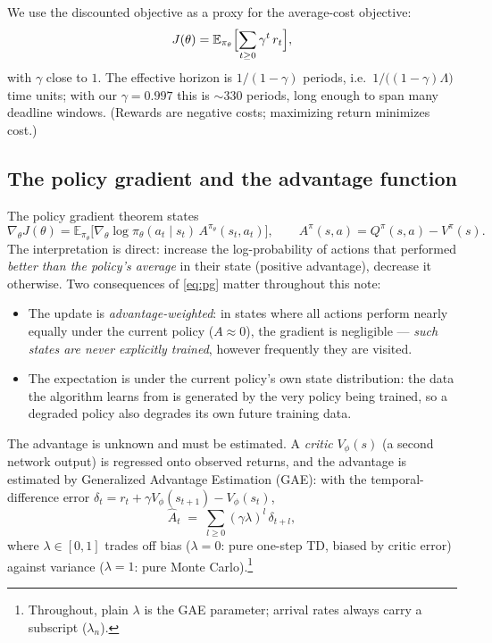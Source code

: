 \documentclass[11pt,a4paper]{article}
\newcommand{\E}{\mathbb{E}}
\begin{document}
We use the discounted objective as a proxy for the average-cost
objective:
\begin{equation}
  J(\theta) = \E_{\pi_\theta}\Bigl[\sum_{t\ge 0} \gamma^{t}\, r_t\Bigr],
\end{equation}
with $\gamma$ close to $1$.  The effective horizon is
$1/(1-\gamma)$ periods, i.e.\ $1/\bigl((1-\gamma)\Lambda\bigr)$ time
units; with our $\gamma = 0.997$ this is ${\sim}330$ periods, long enough
to span many deadline windows.  (Rewards are negative costs; maximizing
return minimizes cost.)

\subsection{The policy gradient and the advantage function}

The policy gradient theorem states
\begin{equation}
  \nabla_\theta J(\theta)
  = \E_{\pi_\theta}\bigl[\nabla_\theta \log \pi_\theta(a_t \mid s_t)\,
    A^{\pi_\theta}(s_t, a_t)\bigr],
  \qquad
  A^{\pi}(s,a) = Q^{\pi}(s,a) - V^{\pi}(s).
  \label{eq:pg}
\end{equation}
The interpretation is direct: increase the log-probability of actions
that performed \emph{better than the policy's average} in their state
(positive advantage), decrease it otherwise.  Two consequences of
\eqref{eq:pg} matter throughout this note:
\begin{itemize}
  \item The update is \emph{advantage-weighted}: in states where all
        actions perform nearly equally under the current policy
        ($A \approx 0$), the gradient is negligible --- \emph{such states
        are never explicitly trained}, however frequently they are
        visited.
  \item The expectation is under the current policy's own state
        distribution: the data the algorithm learns from is generated by
        the very policy being trained, so a degraded policy also degrades
        its own future training data.
\end{itemize}

The advantage is unknown and must be estimated.  A \emph{critic}
$V_\phi(s)$ (a second network output) is regressed onto observed
returns, and the advantage is estimated by Generalized Advantage
Estimation (GAE): with the temporal-difference error
$\delta_t = r_t + \gamma V_\phi(s_{t+1}) - V_\phi(s_t)$,
\begin{equation}
  \hat A_t \;=\; \sum_{l \ge 0} (\gamma \lambda)^{l}\, \delta_{t+l},
  \label{eq:gae}
\end{equation}
where $\lambda \in [0,1]$ trades off bias ($\lambda = 0$: pure one-step
TD, biased by critic error) against variance ($\lambda = 1$: pure Monte
Carlo).\footnote{Throughout, plain $\lambda$ is the GAE parameter;
arrival rates always carry a subscript ($\lambda_n$).}
\end{document}
